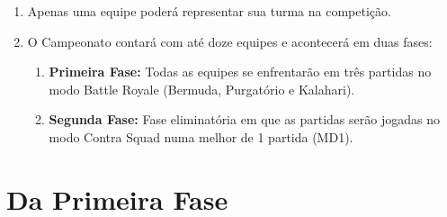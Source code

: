 \begin{enumerate}[start=1,label={\bfseries Art. \arabic*$^\circ$ - }, resume]
    \item Apenas uma equipe poderá representar sua turma na competição.
    \item O Campeonato contará com até doze equipes e acontecerá em duas fases:
        \begin{enumerate}[label={\bfseries \S \arabic*$^\circ$ - }]
            \item \textbf{Primeira Fase:} Todas as equipes se enfrentarão em três
                partidas no modo Battle Royale (Bermuda, Purgatório e Kalahari).

            \item \textbf{Segunda Fase:} Fase eliminatória em que as partidas serão jogadas
                no modo Contra Squad numa melhor de 1 partida (MD1).
        \end{enumerate}
\end{enumerate}

\section*{Da Primeira Fase}

